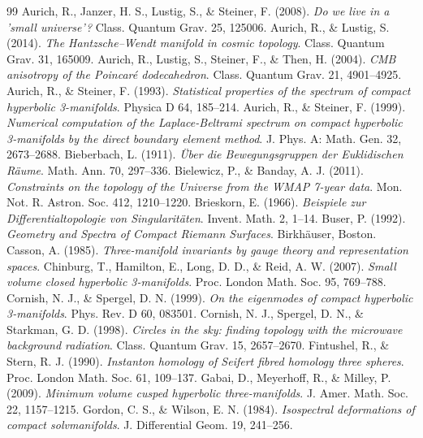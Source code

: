 \documentclass[11pt,a4paper]{article}
\begin{document}
\begin{thebibliography}{99}
 Aurich, R., Janzer, H. S., Lustig, S., \& Steiner, F. (2008). \emph{Do we live in a 'small universe'?} Class. Quantum Grav. 25, 125006.
 Aurich, R., \& Lustig, S. (2014). \emph{The Hantzsche--Wendt manifold in cosmic topology}. Class. Quantum Grav. 31, 165009.
 Aurich, R., Lustig, S., Steiner, F., \& Then, H. (2004). \emph{CMB anisotropy of the Poincar\'e dodecahedron}. Class. Quantum Grav. 21, 4901--4925.
 Aurich, R., \& Steiner, F. (1993). \emph{Statistical properties of the spectrum of compact hyperbolic 3-manifolds}. Physica D 64, 185--214.
 Aurich, R., \& Steiner, F. (1999). \emph{Numerical computation of the Laplace-Beltrami spectrum on compact hyperbolic 3-manifolds by the direct boundary element method}. J. Phys. A: Math. Gen. 32, 2673--2688.
 Bieberbach, L. (1911). \emph{\"Uber die Bewegungsgruppen der Euklidischen R\"aume}. Math. Ann. 70, 297--336.
 Bielewicz, P., \& Banday, A. J. (2011). \emph{Constraints on the topology of the Universe from the WMAP 7-year data}. Mon. Not. R. Astron. Soc. 412, 1210--1220.
 Brieskorn, E. (1966). \emph{Beispiele zur Differentialtopologie von Singularit\"aten}. Invent. Math. 2, 1--14.
 Buser, P. (1992). \emph{Geometry and Spectra of Compact Riemann Surfaces}. Birkh\"auser, Boston.
 Casson, A. (1985). \emph{Three-manifold invariants by gauge theory and representation spaces}.
 Chinburg, T., Hamilton, E., Long, D. D., \& Reid, A. W. (2007). \emph{Small volume closed hyperbolic 3-manifolds}. Proc. London Math. Soc. 95, 769--788.
 Cornish, N. J., \& Spergel, D. N. (1999). \emph{On the eigenmodes of compact hyperbolic 3-manifolds}. Phys. Rev. D 60, 083501.
 Cornish, N. J., Spergel, D. N., \& Starkman, G. D. (1998). \emph{Circles in the sky: finding topology with the microwave background radiation}. Class. Quantum Grav. 15, 2657--2670.
 Fintushel, R., \& Stern, R. J. (1990). \emph{Instanton homology of Seifert fibred homology three spheres}. Proc. London Math. Soc. 61, 109--137.
 Gabai, D., Meyerhoff, R., \& Milley, P. (2009). \emph{Minimum volume cusped hyperbolic three-manifolds}. J. Amer. Math. Soc. 22, 1157--1215.
 Gordon, C. S., \& Wilson, E. N. (1984). \emph{Isospectral deformations of compact solvmanifolds}. J. Differential Geom. 19, 241--256.

\end{thebibliography}
\end{document}
